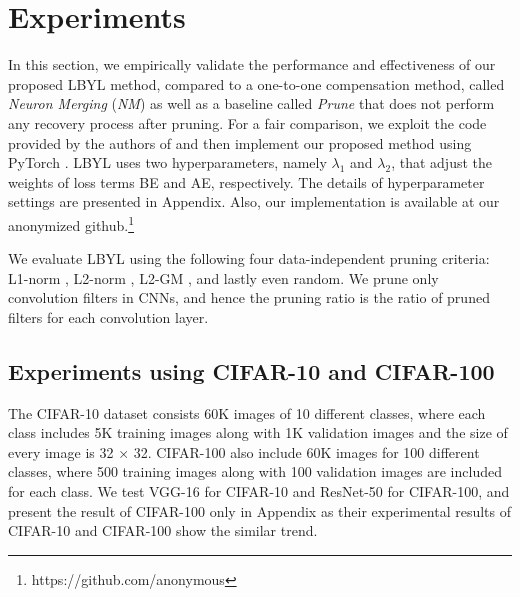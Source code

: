 \section{Experiments} \label{sec:experiments}
In this section, we empirically validate the performance and effectiveness of our proposed LBYL method, compared to a one-to-one compensation method, called \textit{Neuron Merging} (\textit{NM})  \cite{NM} as well as a baseline called \textit{Prune} that does not perform any recovery process after pruning. For a fair comparison, we exploit the code provided by the authors of \cite{NM} and then implement our proposed method using PyTorch \cite{PyTorch}. LBYL uses two hyperparameters, namely $\lambda_1$ and $\lambda_2$, that adjust the weights of loss terms BE and AE, respectively. The details of hyperparameter settings are presented in Appendix. Also, our implementation is available at our anonymized github.\footnote{https://github.com/anonymous}

We evaluate LBYL using the following four data-independent pruning criteria: L1-norm \cite{PFEC}, L2-norm \cite{Soft}, L2-GM \cite{FPGM}, and lastly even random. We prune only convolution filters in CNNs, and hence the pruning ratio is the ratio of pruned filters for each convolution layer.

\subsection{Experiments using CIFAR-10 and CIFAR-100}
The CIFAR-10 dataset \cite{krizhevsky2009learning} consists 60K images of 10 different classes, where each class includes 5K training images along with 1K validation images and the size of every image is 32 × 32. CIFAR-100 \cite{krizhevsky2009learning} also include 60K images for 100 different classes, where 500 training images along with 100 validation images are included for each class. We test VGG-16 \cite{VGG} for CIFAR-10 and ResNet-50 \cite{ResNet} for CIFAR-100, and present the result of CIFAR-100 only in Appendix as 
their experimental results of CIFAR-10 and CIFAR-100 show the similar trend.



